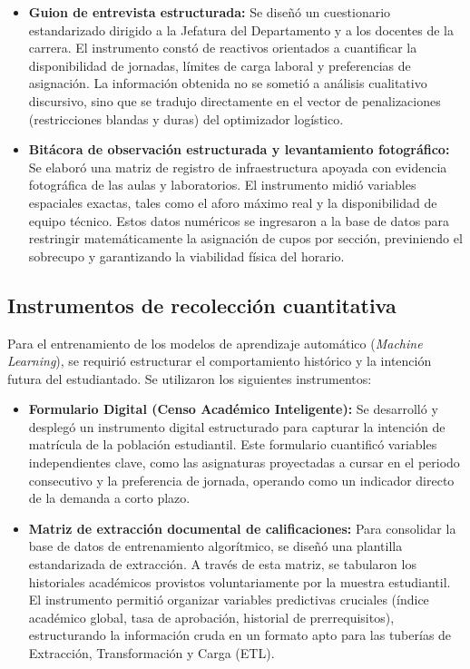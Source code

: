 \begin{itemize}
    \item \textbf{Guion de entrevista estructurada:} Se diseñó un cuestionario estandarizado dirigido a la Jefatura del Departamento y a los docentes de la carrera. El instrumento constó de reactivos orientados a cuantificar la disponibilidad de jornadas, límites de carga laboral y preferencias de asignación. La información obtenida no se sometió a análisis cualitativo discursivo, sino que se tradujo directamente en el vector de penalizaciones (restricciones blandas y duras) del optimizador logístico.
    \item \textbf{Bitácora de observación estructurada y levantamiento fotográfico:} Se elaboró una matriz de registro de infraestructura apoyada con evidencia fotográfica de las aulas y laboratorios. El instrumento midió variables espaciales exactas, tales como el aforo máximo real y la disponibilidad de equipo técnico. Estos datos numéricos se ingresaron a la base de datos para restringir matemáticamente la asignación de cupos por sección, previniendo el sobrecupo y garantizando la viabilidad física del horario.
\end{itemize}

\subsection{Instrumentos de recolección cuantitativa}
Para el entrenamiento de los modelos de aprendizaje automático (\textit{Machine Learning}), se requirió estructurar el comportamiento histórico y la intención futura del estudiantado. Se utilizaron los siguientes instrumentos:

\begin{itemize}
    \item \textbf{Formulario Digital (Censo Académico Inteligente):} Se desarrolló y desplegó un instrumento digital estructurado para capturar la intención de matrícula de la población estudiantil. Este formulario cuantificó variables independientes clave, como las asignaturas proyectadas a cursar en el periodo consecutivo y la preferencia de jornada, operando como un indicador directo de la demanda a corto plazo.
    \item \textbf{Matriz de extracción documental de calificaciones:} Para consolidar la base de datos de entrenamiento algorítmico, se diseñó una plantilla estandarizada de extracción. A través de esta matriz, se tabularon los historiales académicos provistos voluntariamente por la muestra estudiantil. El instrumento permitió organizar variables predictivas cruciales (índice académico global, tasa de aprobación, historial de prerrequisitos), estructurando la información cruda en un formato apto para las tuberías de Extracción, Transformación y Carga (ETL).
\end{itemize}

